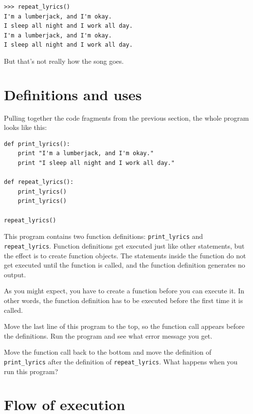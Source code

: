 \documentclass[10pt]{book}
\begin{document}
\begin{verbatim}
>>> repeat_lyrics()
I'm a lumberjack, and I'm okay.
I sleep all night and I work all day.
I'm a lumberjack, and I'm okay.
I sleep all night and I work all day.
\end{verbatim}
%
But that's not really how the song goes.


\section{Definitions and uses}

Pulling together the code fragments from the previous section, the
whole program looks like this:

\begin{verbatim}
def print_lyrics():
    print "I'm a lumberjack, and I'm okay."
    print "I sleep all night and I work all day."

def repeat_lyrics():
    print_lyrics()
    print_lyrics()

repeat_lyrics()
\end{verbatim}
%
This program contains two function definitions: \verb"print_lyrics" and
\verb"repeat_lyrics".  Function definitions get executed just like other
statements, but the effect is to create function objects.  The statements
inside the function do not get executed until the function is called, and
the function definition generates no output.

As you might expect, you have to create a function before you can
execute it.  In other words, the function definition has to be
executed before the first time it is called.

\begin{exercise}

Move the last line of this program
to the top, so the function call appears before the definitions. Run 
the program and see what error
message you get.

\end{exercise}

\begin{exercise}

Move the function call back to the bottom
and move the definition of \verb"print_lyrics" after the definition of
\verb"repeat_lyrics".  What happens when you run this program?

\end{exercise}


\section{Flow of execution}
\end{document}
